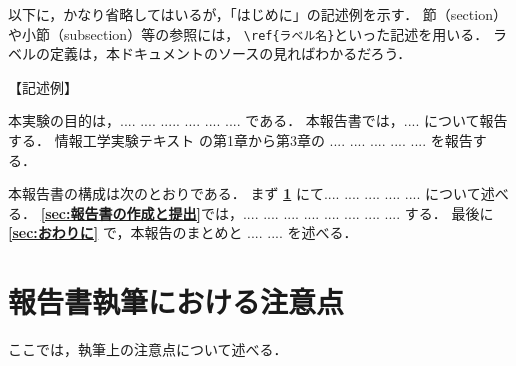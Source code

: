 \documentclass{jarticle}[11pt]
\begin{document}
    以下に，かなり省略してはいるが，「{\gt はじめに}」の記述例を示す．
    節（section）や小節（subsection）等の参照には，
    \verb|\ref{ラベル名}|といった記述を用いる．
    ラベルの定義は，本ドキュメントのソースの見ればわかるだろう．
     
    \noindent
    【記述例】
     
    本実験の目的は，.... .... ..... .... .... .... である．
    本報告書では，.... について報告する．
    情報工学実験テキスト \cite{bib:実験テキスト} の第1章から第3章の
    .... .... .... .... .... を報告する．
     
    本報告書の構成は次のとおりである．
    まず 
    {\bf \ref{sec:報告書執筆における注意点}} にて.... .... .... .... .... 
    について述べる．
    {\bf \ref{sec:報告書の作成と提出}}では，.... .... .... .... .... .... 
    .... .... する．
    最後に {\bf \ref{sec:おわりに}} で，本報告のまとめと
    .... .... を述べる．
     
    \section{報告書執筆における注意点}
    \label{sec:報告書執筆における注意点}
     
    ここでは，執筆上の注意点について述べる．
     
\end{document}
